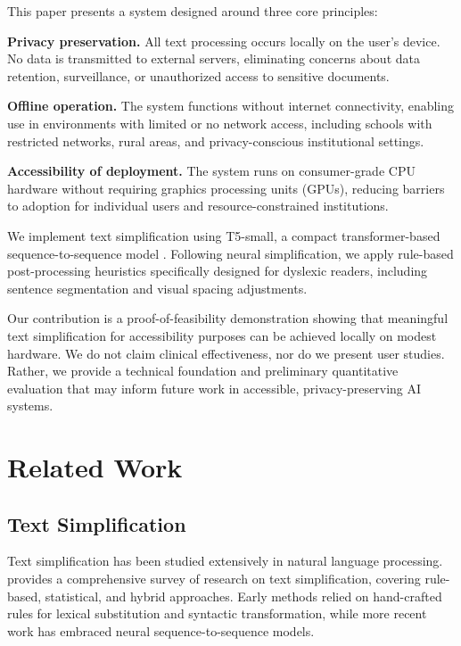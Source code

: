 \documentclass[11pt]{article}
\begin{document}
This paper presents a system designed around three core principles:

\textbf{Privacy preservation.} All text processing occurs locally on the user's device. No data is transmitted to external servers, eliminating concerns about data retention, surveillance, or unauthorized access to sensitive documents.

\textbf{Offline operation.} The system functions without internet connectivity, enabling use in environments with limited or no network access, including schools with restricted networks, rural areas, and privacy-conscious institutional settings.

\textbf{Accessibility of deployment.} The system runs on consumer-grade CPU hardware without requiring graphics processing units (GPUs), reducing barriers to adoption for individual users and resource-constrained institutions.

We implement text simplification using T5-small, a compact transformer-based sequence-to-sequence model \citep{raffel2020}. Following neural simplification, we apply rule-based post-processing heuristics specifically designed for dyslexic readers, including sentence segmentation and visual spacing adjustments.

Our contribution is a proof-of-feasibility demonstration showing that meaningful text simplification for accessibility purposes can be achieved locally on modest hardware. We do not claim clinical effectiveness, nor do we present user studies. Rather, we provide a technical foundation and preliminary quantitative evaluation that may inform future work in accessible, privacy-preserving AI systems.

\section{Related Work}

\subsection{Text Simplification}

Text simplification has been studied extensively in natural language processing. \citet{siddharthan2014} provides a comprehensive survey of research on text simplification, covering rule-based, statistical, and hybrid approaches. Early methods relied on hand-crafted rules for lexical substitution and syntactic transformation, while more recent work has embraced neural sequence-to-sequence models.
\end{document}
